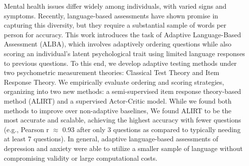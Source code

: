Mental health issues differ widely among individuals, with varied signs and symptoms. Recently, language-based assessments have shown promise in capturing this diversity, but they require a substantial sample of words per person for accuracy. This work introduces the task of Adaptive Language-Based Assessment (ALBA), which involves adaptively ordering questions while also scoring an individual’s latent psychological trait using limited language responses to previous questions. To this end, we develop adaptive testing methods under two psychometric measurement theories: Classical Test Theory and Item Response Theory. We empirically evaluate ordering and scoring strategies, organizing into two new methods: a semi-supervised item response theory-based method (ALIRT) and a supervised Actor-Critic model. While we found both methods to improve over non-adaptive baselines, We found ALIRT to be the most accurate and scalable, achieving the highest accuracy with fewer questions (e.g., Pearson r $\approx$ 0.93 after only 3 questions as compared to typically needing at least 7 questions). In general, adaptive language-based assessments of depression and anxiety were able to utilize a smaller sample of language without compromising validity or large computational costs.